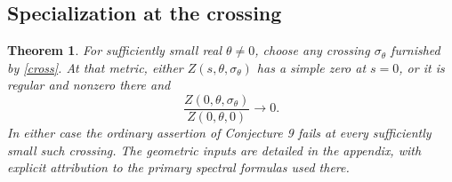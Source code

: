 \documentclass[11pt,letterpaper,reqno]{amsart}
\newtheorem{theorem}{Theorem}[section]
\theoremstyle{remark}
\begin{document}
\subsection{Specialization at the crossing}\label{sec:specialization}
\begin{theorem}\label{obstruction}
For sufficiently small real $\theta\neq0$, choose any crossing
$\sigma_\theta$ furnished by \eqref{cross}. At that metric, either
$Z(s,\theta,\sigma_\theta)$ has a simple zero at $s=0$, or it is
regular and nonzero there and
\begin{equation}\label{smallvalue}
 \frac{Z(0,\theta,\sigma_\theta)}{Z(0,\theta,0)}\longrightarrow0.
\end{equation}
In either case the ordinary assertion of Conjecture 9 fails at every
sufficiently small such crossing. The geometric inputs are detailed in the appendix, with
explicit attribution to the primary spectral formulas used there.
\end{theorem}
\end{document}
